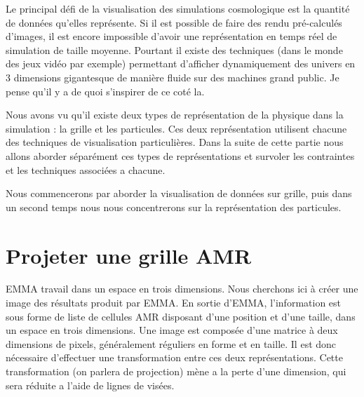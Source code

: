 


Le principal défi de la visualisation des simulations cosmologique est la quantité de données qu'elles représente.
Si il est possible de faire des rendu pré-calculés d'images, il est encore impossible d'avoir une représentation en temps réel de simulation de taille moyenne.
Pourtant il existe des techniques (dans le monde des jeux vidéo par exemple) permettant d'afficher dynamiquement des univers en 3 dimensions gigantesque de manière fluide sur des machines grand public.
Je pense qu'il y a de quoi s'inspirer de ce coté la.

Nous avons vu %
qu'il existe deux types de représentation de la physique dans la simulation : la grille et les particules.
Ces deux représentation utilisent chacune des techniques de visualisation particulières.
Dans la suite de cette partie nous allons aborder séparément ces types de représentations et survoler les contraintes et les techniques associées a chacune.

Nous commencerons par aborder la visualisation de données sur grille, puis dans un second temps nous nous concentrerons sur la représentation des particules.


\section{Projeter une grille AMR}

EMMA travail dans un espace en trois dimensions.
Nous cherchons ici à créer une image des résultats produit par EMMA.
En sortie d'EMMA, l'information est sous forme de liste de cellules \ac{AMR} disposant d'une position et d'une taille, dans un espace en trois dimensions.
Une image est composée d'une matrice à deux dimensions de pixels, généralement réguliers en forme et en taille.
Il est donc nécessaire d'effectuer une transformation entre ces deux représentations.
Cette transformation (on parlera de projection) mène a la perte d'une dimension, qui sera réduite a l'aide de lignes de visées.



